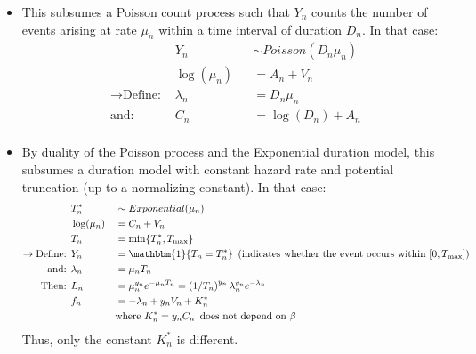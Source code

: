 \documentclass[12pt]{article}
\begin{document}
\begin{itemize}
	\item This subsumes a Poisson count process such that $Y_n$ counts the number of events arising at rate $\mu_n$ within a time interval of duration $D_n$. In that case:
	\begin{equation}
	\begin{aligned}
		& Y_n && \sim Poisson(D_n \mu_n) \\
		& \log(\mu_n) && = A_n + V_n \\
	\rightarrow \text{Define: }	& \lambda_n && = D_n \mu_n \\
	\text{and: }	& C_n && = \log(D_n) + A_n \\
	\end{aligned}
	\end{equation}
	
	\item By duality of the Poisson process and the Exponential duration model, this subsumes a duration model with constant hazard rate and potential truncation (up to a normalizing constant). In that case: 
	\begin{equation}
	\begin{aligned}
			& T_n^* && \sim Exponential(\mu_n) \\
			& \log(\mu_n) && = C_n + V_n \\
			& T_n && = \min\{T_n^*, T_{\max}\} \\
	\rightarrow \text{Define: }	& Y_n && = \mathbbm{1}\{T_n = T_n^*\} \hspace*{5pt} (\text{indicates whether the event occurs within } [0, T_{\max}] ) \\
	\text{and: }	& \lambda_n && = \mu_n T_n \\
	\text{Then: } & L_n &&= \mu_n^{y_n} e^{-\mu_n T_n} = \left(1/T_n\right)^{y_n} \lambda_n^{y_n} e^{-\lambda_n} \\
	& f_n && = - \lambda_n + y_n V_n + K_n^* \\
	& && \text{where } K_n^* =  y_n C_n \hspace*{5pt} \text{does not depend on } \beta \\
	\end{aligned}
	\end{equation}
	Thus, only the constant $K_n^*$ is different.
\end{itemize}
\end{document}
